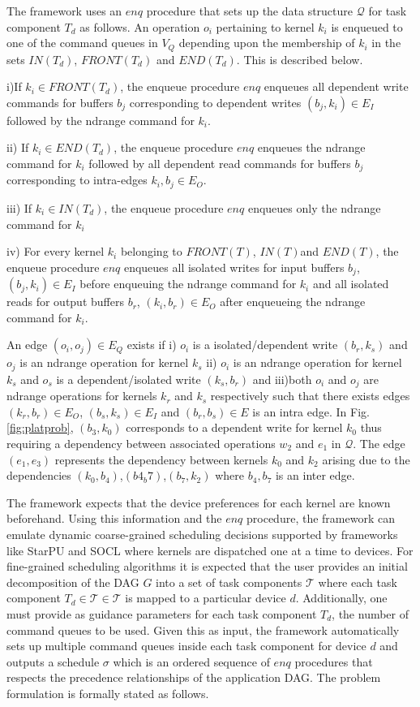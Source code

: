 	The framework uses an $enq$ procedure that sets up the data structure $\mathcal{Q}$ for task component $T_d$ as follows.
	An operation $o_i$ pertaining to kernel $k_i$  is enqueued to one of the command queues in $V_Q$ depending upon the membership of $k_i$ in the sets $IN(T_d)$, $FRONT(T_d)$ and $END(T_d)$. This is described below.
	\par \noindent i)If $k_i \in FRONT(T_d)$, the enqueue procedure $enq$ enqueues all dependent write commands for buffers $b_j$ corresponding to dependent writes $(b_j,k_i) \in E_I$ followed by the ndrange command for $k_i$.
	\par \noindent ii) If $k_i \in END(T_d)$, the enqueue procedure $enq$ enqueues the ndrange command for $k_i$ followed by all dependent read commands for buffers $b_j$ corresponding to intra-edges $k_i,b_j \in E_O$.  
	\par \noindent iii) If $k_i \in IN(T_d)$, the enqueue procedure $enq$ enqueues only the ndrange command for $k_i$ 
	\par \noindent iv) For every kernel $k_i$  belonging to $FRONT(T)$, $IN(T) $and $END(T)$, the enqueue procedure $enq$ enqueues all isolated writes for input buffers $b_j$, $(b_j,k_i) \in E_I$ before enqueuing the ndrange command for $k_i$ and all isolated reads for output buffers $b_r$, $(k_i,b_r) \in E_O$ after enqueueing the ndrange command for $k_i$. 
	\par An edge $(o_i,o_j) \in E_Q$ exists if i) $o_i$ is a isolated/dependent write $(b_r,k_s)$ and $o_j$ is an ndrange operation for kernel $k_s$ ii) $o_i$ is an ndrange operation for kernel $k_s$ and $o_s$ is a dependent/isolated write $(k_s,b_r)$ and iii)both $o_i$ and $o_j$ are ndrange operations for kernels $k_r$ and $k_s$ respectively such that there exists edges $(k_r,b_r) \in E_O$, $(b_s,k_s) \in E_I$  and $(b_r,b_s) \in E$ is an intra edge. In Fig. \ref{fig:platprob}, $(b_3,k_0)$ corresponds to a dependent write for kernel $k_0$ thus requiring a dependency between associated operations $w_2$ and $e_1$ in $\mathcal{Q}$.  The edge $(e_1,e_3)$ represents the dependency between kernels $k_0$ and $k_2$ arising due to the dependencies $(k_0,b_4)$,$(b4_b7)$,$(b_7,k_2)$ where $b_4,b_7$ is an inter edge. 
	\par The framework expects that the device preferences for each kernel are known beforehand. Using this information and the $enq$ procedure, the framework can emulate dynamic coarse-grained scheduling decisions supported by frameworks like StarPU and SOCL where kernels are dispatched one at a time to devices. For fine-grained scheduling algorithms it is expected that the user provides an initial decomposition of the DAG $G$ into a set of task components $\mathcal{T}$ where each task component $T_d \in \mathcal{T} \in \mathcal{T} $ is mapped to a particular device $d$. Additionally, one must provide as guidance parameters for each task component $T_d$, the number of command queues to be used. Given this as input, the framework automatically sets up multiple command queues inside each task component for  device $d$ and outputs a schedule $\sigma$ which is an ordered sequence of $enq$ procedures that respects the precedence relationships of the application DAG. The problem formulation is formally stated as follows.

